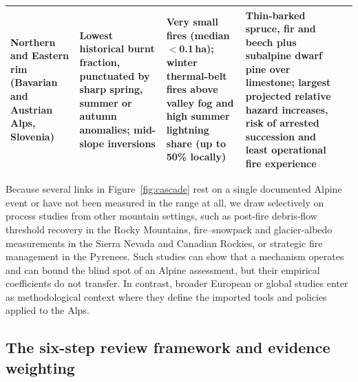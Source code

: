 \documentclass[11pt,a4paper]{article}
\begin{document}
\begin{table}[htbp]
\begin{tabularx}{\textwidth}{@{}>{\raggedright\arraybackslash}p{2.3cm} >{\raggedright\arraybackslash}p{2.9cm} >{\raggedright\arraybackslash}p{3.0cm} >{\raggedright\arraybackslash}X >{\raggedright\arraybackslash}p{2.7cm}@{}}
Northern and Eastern rim (Bavarian and Austrian Alps, Slovenia) & Lowest historical burnt fraction, punctuated by sharp spring, summer or autumn anomalies; mid-slope inversions & Very small fires (median $<$0.1\,ha); winter thermal-belt fires above valley fog and high summer lightning share (up to 50\% locally) & Thin-barked spruce, fir and beech plus subalpine dwarf pine over limestone; largest projected relative hazard increases, risk of arrested succession and least operational fire experience & \citealp{schunk_forest_2013, muller_anomalies_2015, degiuli_arrested_2024, gerberding_mapping_2025} \\
\bottomrule
\end{tabularx}
\end{table}

Because several links in Figure~\ref{fig:cascade} rest on a single documented Alpine event or have not been measured in the range at all, we draw selectively on process studies from other mountain settings, such as post-fire debris-flow threshold recovery in the Rocky Mountains, fire--snowpack and glacier-albedo measurements in the Sierra Nevada and Canadian Rockies, or strategic fire management in the Pyrenees. Such studies can show that a mechanism operates and can bound the blind spot of an Alpine assessment, but their empirical coefficients do not transfer. In contrast, broader European or global studies enter as methodological context where they define the imported tools and policies applied to the Alps.

\subsection{The six-step review framework and evidence weighting}
\end{document}
